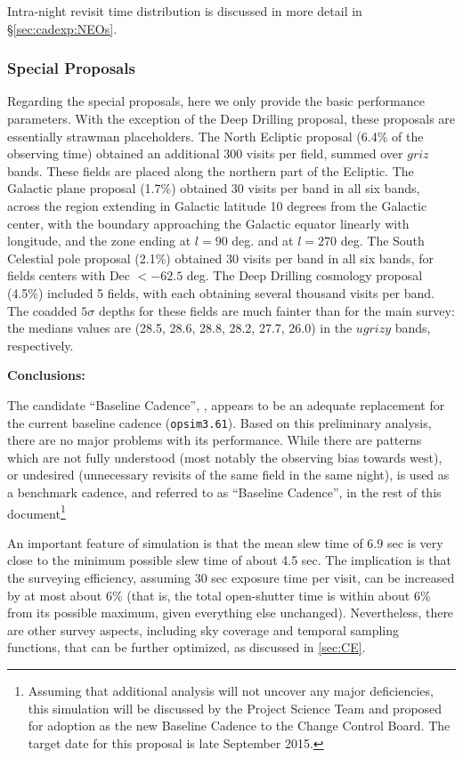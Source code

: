 Intra-night revisit time distribution is discussed in more detail in
\S\ref{sec:cadexp:NEOs}.


\subsubsection{Special Proposals}

Regarding the special proposals, here we only provide the basic
performance parameters. With the exception of the Deep Drilling
proposal, these proposals are essentially strawman placeholders. The
North Ecliptic proposal (6.4\% of the observing time) obtained an
additional 300 visits per field, summed over $griz$ bands. These
fields are placed along the northern part of the Ecliptic. The
Galactic plane proposal (1.7\%) obtained 30 visits per band in all six
bands, across the region extending in Galactic latitude 10 degrees
from the Galactic center, with the boundary approaching the Galactic
equator linearly with longitude, and the zone ending at $l=90$ deg.
and at $l=270$ deg. The South Celestial pole proposal (2.1\%) obtained
30 visits per band in all six bands, for fields centers with Dec $<
-62.5$ deg. The Deep Drilling cosmology proposal (4.5\%) included 5
fields, with each obtaining several thousand visits per band. The
coadded $5\sigma$ depths for these fields are much fainter than for
the main survey: the medians values are (28.5, 28.6, 28.8, 28.2, 27.7,
26.0) in the $ugrizy$ bands, respectively.


\vskip 0.2in
{\bf Conclusions:}

The candidate “Baseline Cadence”, , appears to
be an adequate replacement for the current baseline cadence
(\texttt{opsim3.61}). Based on this preliminary analysis, there are no
major problems with its performance. While there are patterns which
are not fully understood (most notably the observing bias towards
west),  or undesired (unnecessary revisits of the same field in the
same night),  is used as a benchmark cadence,
and referred to as ``Baseline Cadence'',  in the rest of this
document\footnote{Assuming that additional analysis will not uncover
any major deficiencies, this simulation will be discussed by the
Project Science Team and proposed for adoption as the new Baseline
Cadence to the Change Control Board. The target date for this proposal
is late September 2015.}

An important feature of  simulation is that the
mean slew time of 6.9 sec is very close to the minimum possible slew
time of about 4.5 sec. The implication is that the surveying
efficiency, assuming 30 sec exposure time per visit, can be increased
by at most about 6\% (that is, the total open-shutter time is within
about 6\% from its possible maximum, given everything else unchanged).
Nevertheless, there are other survey aspects, including sky coverage
and temporal sampling functions, that can be further optimized, as
discussed in \autoref{sec:CE}.

